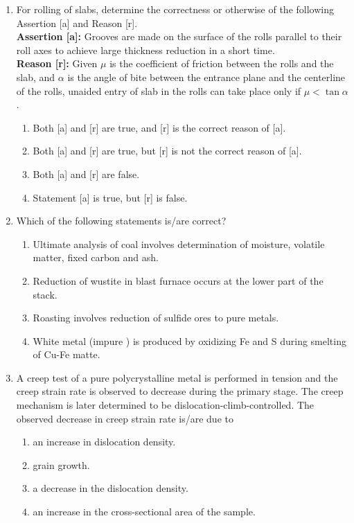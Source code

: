 \documentclass[journal]{IEEEtran}
\theoremstyle{remark}
\begin{document}
\begin{enumerate}[resume]
\item For rolling of slabs, determine the correctness or otherwise of the following Assertion [a] and Reason [r]. \hfill{} \\
\textbf{Assertion [a]:} Grooves are made on the surface of the rolls parallel to their roll axes to achieve large thickness reduction in a short time. \\
\textbf{Reason [r]:} Given $\mu$ is the coefficient of friction between the rolls and the slab, and $\alpha$ is the angle of bite between the entrance plane and the centerline of the rolls, unaided entry of slab in the rolls can take place only if $\mu < \tan \alpha$.
\begin{enumerate}
\item Both [a] and [r] are true, and [r] is the correct reason of [a].
\item Both [a] and [r] are true, but [r] is not the correct reason of [a].
\item Both [a] and [r] are false.
\item Statement [a] is true, but [r] is false.
\end{enumerate}

\item Which of the following statements is/are correct?  \hfill{}
\begin{enumerate}
\item Ultimate analysis of coal involves determination of moisture, volatile matter, fixed carbon and ash.
\item Reduction of wustite in blast furnace occurs at the lower part of the stack.
\item Roasting involves reduction of sulfide ores to pure metals.
\item White metal (impure ) is produced by oxidizing Fe and S during smelting of Cu-Fe matte.
\end{enumerate}

\item A creep test of a pure polycrystalline metal is performed in tension and the creep strain rate is observed to decrease during the primary stage. The creep mechanism is later determined to be dislocation-climb-controlled. The observed decrease in creep strain rate is/are due to  \hfill{}
\begin{enumerate}
\item an increase in dislocation density.
\item grain growth.
\item a decrease in the dislocation density.
\item an increase in the cross-sectional area of the sample.
\end{enumerate}


\end{enumerate}
\end{document}
